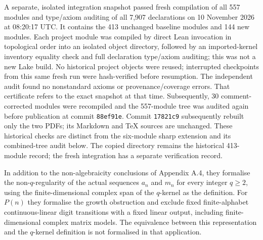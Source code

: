 \documentclass[11pt]{article}
\begin{document}
A separate, isolated integration snapshot passed fresh compilation of all 557 modules and type/axiom auditing of all 7,907 declarations on 10 November 2026 at 08:20:17 UTC. It contains the 413 unchanged baseline modules and 144 new modules. Each project module was compiled by direct Lean invocation in topological order into an isolated object directory, followed by an imported-kernel inventory equality check and full declaration type/axiom auditing; this was not a new Lake build. No historical project objects were reused; interrupted checkpoints from this same fresh run were hash-verified before resumption. The independent audit found no nonstandard axioms or provenance/coverage errors. That certificate refers to the exact snapshot at that time. Subsequently, 30 comment-corrected modules were recompiled and the 557-module tree was audited again before publication at commit \texttt{88ef91e}. Commit \texttt{17821c9} subsequently rebuilt only the two PDFs; its Markdown and TeX sources are unchanged. These historical checks are distinct from the six-module sharp extension and its combined-tree audit below. The copied  directory remains the historical 413-module record; the fresh integration has a separate verification record.

In addition to the non-algebraicity conclusions of Appendix A.4, they formalise the non-$q$-regularity of the actual sequences $a_n$ and $m_n$ for every integer $q\ge2$, using the finite-dimensional complex span of the $q$-kernel as the definition. For $P(n)$ they formalise the growth obstruction and exclude fixed finite-alphabet continuous-linear digit transitions with a fixed linear output, including finite-dimensional complex matrix models. The equivalence between this representation and the $q$-kernel definition is not formalised in that application.
\end{document}
